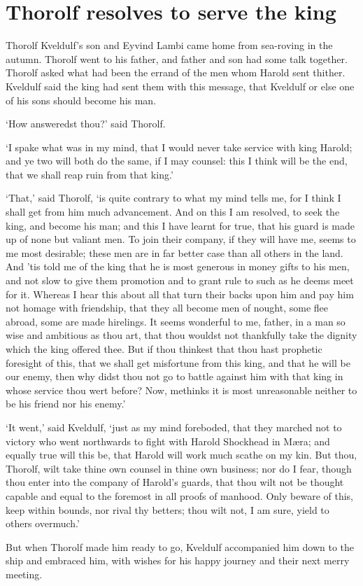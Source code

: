 \chapter{Thorolf resolves to serve the king}
Thorolf Kveldulf's son and Eyvind Lambi came home from sea-roving in the autumn. Thorolf went to his father, and father and son had some talk together. Thorolf asked what had been the errand of the men whom Harold sent thither. Kveldulf said the king had sent them with this message, that Kveldulf or else one of his sons should become his man.

`How answeredst thou?' said Thorolf.

`I spake what was in my mind, that I would never take service with king Harold; and ye two will both do the same, if I may counsel: this I think will be the end, that we shall reap ruin from that king.'

`That,' said Thorolf, `is quite contrary to what my mind tells me, for I think I shall get from him much advancement. And on this I am resolved, to seek the king, and become his man; and this I have learnt for true, that his guard is made up of none but valiant men. To join their company, if they will have me, seems to me most desirable; these men are in far better case than all others in the land. And 'tis told me of the king that he is most generous in money gifts to his men, and not slow to give them promotion and to grant rule to such as he deems meet for it. Whereas I hear this about all that turn their backs upon him and pay him not homage with friendship, that they all become men of nought, some flee abroad, some are made hirelings. It seems wonderful to me, father, in a man so wise and ambitious as thou art, that thou wouldst not thankfully take the dignity which the king offered thee. But if thou thinkest that thou hast prophetic foresight of this, that we shall get misfortune from this king, and that he will be our enemy, then why didst thou not go to battle against him with that king in whose service thou wert before? Now, methinks it is most unreasonable neither to be his friend nor his enemy.'

`It went,' said Kveldulf, `just as my mind foreboded, that they marched not to victory who went northwards to fight with Harold Shockhead in M\ae ra; and equally true will this be, that Harold will work much scathe on my kin. But thou, Thorolf, wilt take thine own counsel in thine own business; nor do I fear, though thou enter into the company of Harold's guards, that thou wilt not be thought capable and equal to the foremost in all proofs of manhood. Only beware of this, keep within bounds, nor rival thy betters; thou wilt not, I am sure, yield to others overmuch.'

But when Thorolf made him ready to go, Kveldulf accompanied him down to the ship and embraced him, with wishes for his happy journey and their next merry meeting.

